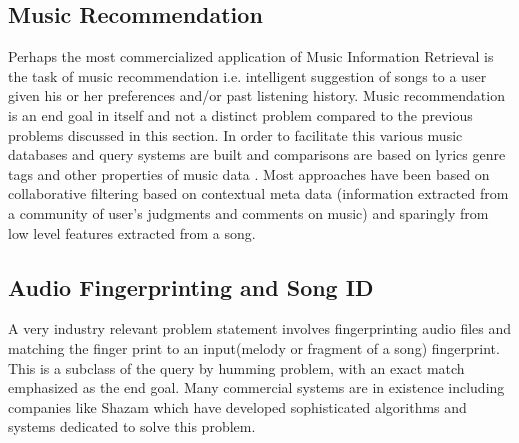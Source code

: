 \subsection{Music Recommendation}

\noindent Perhaps the most commercialized application of Music Information Retrieval is the task of music recommendation i.e. intelligent suggestion of songs to a user given his or her preferences and/or past listening history. Music recommendation is an end goal in itself and not a distinct problem compared to the previous problems discussed in this section. In order to facilitate this various music databases and query systems are built and comparisons are based on lyrics genre tags and other properties of music data \cite{musicrecSurvey}. Most approaches have been based on collaborative filtering based on contextual meta data (information extracted from a community of user's judgments and comments on music) and sparingly from low level features extracted from a song. 

\subsection{Audio Fingerprinting and Song ID}

\noindent A very industry relevant problem statement involves fingerprinting audio files and matching the finger print to an input(melody or fragment of a song) fingerprint. This is a subclass of the query by humming problem, with an exact match emphasized as the end goal. Many commercial systems are in existence including companies like Shazam \cite{shazam} which have developed sophisticated algorithms and systems dedicated to solve this problem.



